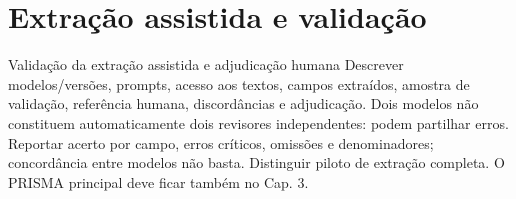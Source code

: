 
\chapter{Extração assistida e validação}
\label{app:validacao}
{Validação da extração assistida e adjudicação humana}
{Descrever modelos/versões, prompts, acesso aos textos, campos extraídos,
amostra de validação, referência humana, discordâncias e adjudicação.
Dois modelos não constituem automaticamente dois revisores independentes:
podem partilhar erros. Reportar acerto por campo, erros críticos, omissões
e denominadores; concordância entre modelos não basta. Distinguir piloto
de extração completa. O PRISMA principal deve ficar também no Cap. 3.}%


